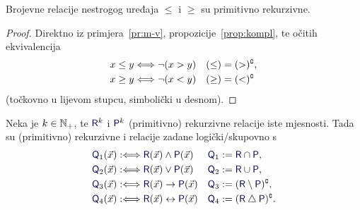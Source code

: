 \begin{korolar}\label{kor:mj-vj}
Brojevne relacije nestrogog uređaja $\le$ i $\ge$ su primitivno rekurzivne.
\end{korolar}
\begin{proof}
Direktno iz primjera~\ref{pr:m-v}, propozicije~\ref{prop:kompl}, te očitih ekvivalencija
\begin{align}
    x\le y&\Longleftrightarrow\lnot(x>y) & (\le) &= (>)\sp{{\scriptscriptstyle\complement}}\text,\\
    x\ge y&\Longleftrightarrow\lnot(x<y) & (\ge) &= (<)\sp{{\scriptscriptstyle\complement}}
\end{align}
(točkovno u lijevom stupcu, simbolički u desnom).
\end{proof}

\begin{propozicija}\label{prop:vezn}
Neka je $k\in{\mathbb N}_+$, te $\f R^k$ i $\f P^k$ (primitivno) rekurzivne relacije iste mjesnosti. Tada su (primitivno) rekurzivne i relacije zadane logički\slash skupovno s
\begin{align}
    \f Q_1(\vec x)&:\Longleftrightarrow\f R(\vec x)\land\f P(\vec x)
    &
    \f Q_1 &:=\f R \cap\f P\text,
    \\
    \f Q_2(\vec x)&:\Longleftrightarrow\f R(\vec x)\lor\f P(\vec x)
    &
    \f Q_2 &:=\f R \cup\f P\text,
    \\
    \f Q_3(\vec x)&:\Longleftrightarrow\f R(\vec x)\to\f P(\vec x)
    &
    \f Q_3 &:=(\f R\setminus\f P)\kompl\text,
    \\
    \f Q_4(\vec x)&:\Longleftrightarrow\f R(\vec x)\leftrightarrow\f P(\vec x)
    &
    \f Q_4 &:=(\f R\mathbin\triangle\f P)\kompl\text.
\end{align}
\end{propozicija}
